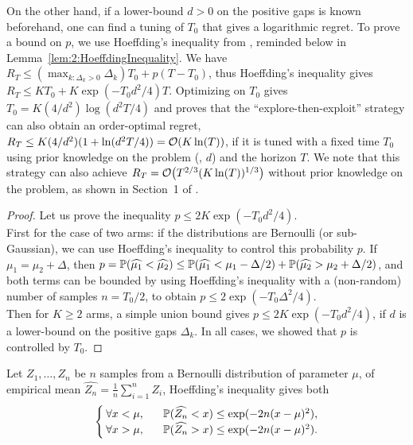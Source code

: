On the other hand, if a lower-bound $d>0$ on the positive gaps is known beforehand, one can find a tuning of $T_0$ that gives a logarithmic regret.
%
To prove a bound on $p$, we use Hoeffding's inequality from \cite{hoeffding1963probability}, reminded below in Lemma~\ref{lem:2:HoeffdingInequality}.
%
We have $R_T \leq (\max_{k: \Delta_k > 0} \Delta_k) T_0 + p (T - T_0)$, thus Hoeffding's inequality gives $R_T \leq K T_0 + K \exp(-T_0 d^2/4) T$. Optimizing on $T_0$ gives $T_0 = K (4/d^2) \log(d^2 T / 4)$
and proves that the ``explore-then-exploit'' strategy can also obtain an order-optimal regret, $R_T \leq K (4/d^2) (1 + \ln(d^2 T / 4)) = \mathop{}\mathopen{}\mathcal{O}\mathopen{}\left(K \ln(T)\right)$, if it is tuned with a fixed time $T_0$ using prior knowledge on the problem (\ie, $d$) and the horizon $T$.
%
We note that this strategy can also achieve $R_T = \mathop{}\mathopen{}\mathcal{O}\mathopen{}\left(T^{2/3} (K \ln(T))^{1/3}\right)$ without prior knowledge on the problem, as shown in Section~1 of \cite{Slivkins2019}.
%
\begin{proof}
    Let us prove the inequality $p \leq 2 K \exp(-T_0 d^2 / 4)$.\\
    \indent
    First for the case of two arms:
    if the distributions are Bernoulli (or sub-Gaussian), we can use Hoeffding's inequality to control this probability $p$.
    If $\mu_1 = \mu_2 + \Delta$, then
    $p = \mathbb{P}(\widehat{\mu_1} < \widehat{\mu_2}) \leq \mathbb{P}(\widehat{\mu_1} < \mu_1 - \Delta/2) + \mathbb{P}(\widehat{\mu_2} > \mu_2 + \Delta/2)$, and both terms can be bounded by using Hoeffding's inequality with a (non-random) number of samples $n=T_0/2$,
    to obtain $p \leq 2 \exp(-T_0 \Delta^2 / 4)$.\\
    \indent
    Then for $K\geq2$ arms, a simple union bound gives
    $p \leq 2 K \exp(-T_0 d^2 / 4)$, if $d$ is a lower-bound on the positive gaps $\Delta_k$.
    In all cases, we showed that $p$ is controlled by $T_0$.
\end{proof}

\begin{lemma}\label{lem:2:HoeffdingInequality}
    Let $Z_1,\dots,Z_n$ be $n$ \iid{} samples from a Bernoulli distribution of parameter $\mu$, of empirical mean $\widehat{Z_n} = \frac{1}{n} \sum\limits_{i=1}^n Z_i$, Hoeffding's inequality gives both
    \begin{align}\label{eq:2:HoeffdingInequality}
        \begin{cases}
            \forall x < \mu, \;\;\; & \mathbb{P}(\widehat{Z_n} < x) \leq \exp(-2 n (x-\mu)^2),
            \\
            \forall x > \mu, \;\;\; & \mathbb{P}(\widehat{Z_n} > x) \leq \exp(-2 n (x-\mu)^2).
        \end{cases}
    \end{align}
\end{lemma}

